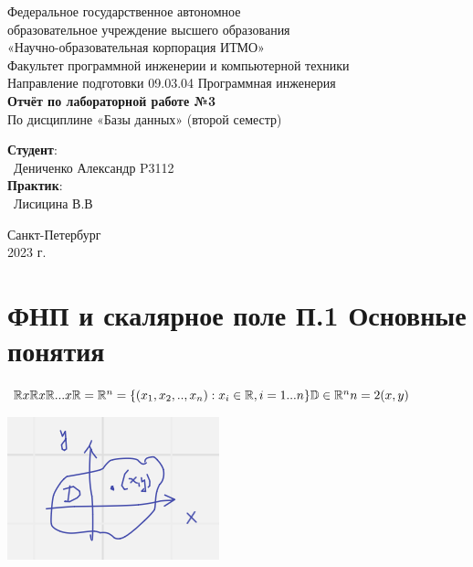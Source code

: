 \documentclass{article}
\begin{document}
\begin{center}
    \Large
    Федеральное государственное автономное \\
    образовательное учреждение высшего образования \\ 
    «Научно-образовательная корпорация ИТМО»\\
    \vspace{0.5cm}
    \large
    Факультет программной инженерии и компьютерной техники \\
    Направление подготовки 09.03.04 Программная инженерия \\
    \vspace{1cm}
    \Large
    \textbf{Отчёт по лабораторной работе №3} \\
    По дисциплине «Базы данных» (второй семестр)\\
    \large
    \vspace{8cm}

    \begin{minipage}{.33\textwidth}
    \end{minipage}
    \hfill
    \begin{minipage}{.4\textwidth}
    
        \textbf{Студент}: \vspace{.1cm} \\
        \ Дениченко Александр P3112\\
        \textbf{Практик}:  \\
        \ Лисицина В.В
    \end{minipage}
    \vfill
Санкт-Петербург\\ 2023 г.
\end{center}

\newpage

\section{ФНП и скалярное поле
П.1 Основные понятия}


$\mathbb{R} x \mathbb{R} x \mathbb{R} ... x \mathbb{R} = \mathbb{R}^n = \{(x_1, x_2, .., x_n): x_i \in \mathbb{R}, i = 1 ... n\}\\
\mathbb{D} \in \mathbb{R}^n \\
n = 2 (x,y)$


\includegraphics[width=.3\textwidth]{1.1} 
\end{document}
